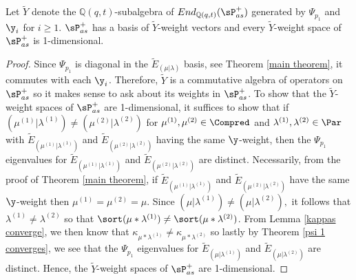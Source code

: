 \begin{thm}\label{second main theorem}
    Let $\widetilde{Y}$ denote the $\mathbb{Q}(q,t)$-subalgebra of $End_{\mathbb{Q}(q,t)}(\sP_{as}^{+})$ generated by $\Psi_{p_1}$ and $\y_i$ for $i \geq 1$. $\sP_{as}^{+}$ has a basis of $\widetilde{Y}$-weight vectors and every $\widetilde{Y}$-weight space of $\sP_{as}^{+}$ is 1-dimensional.
\end{thm}
\begin{proof}
Since $\Psi_{p_1}$ is diagonal in the $\widetilde{E}_{(\mu|\lambda)}$ basis, see Theorem \ref{main theorem}, it commutes with each $\y_i$. Therefore, $\widetilde{Y}$ is a commutative algebra of operators on $\sP_{as}^{+}$ so it makes sense to ask about its weights in $\sP_{as}^{+}$. To show that the $\widetilde{Y}$-weight spaces of $\sP_{as}^{+}$ are 1-dimensional, it suffices to show that if $(\mu^{(1)}|\lambda^{(1)}) \neq (\mu^{(2)}|\lambda^{(2)})$ for $\mu^{(1)},\mu^{(2)} \in \Compred$ and $\lambda^{(1)},\lambda^{(2)} \in \Par$ with $\widetilde{E}_{(\mu^{(1)}|\lambda^{(1)})}$ and $\widetilde{E}_{(\mu^{(2)}|\lambda^{(2)})}$ having the same $\y$-weight, then the $\Psi_{p_1}$ eigenvalues for $\widetilde{E}_{(\mu^{(1)}|\lambda^{(1)})}$ and $\widetilde{E}_{(\mu^{(2)}|\lambda^{(2)})}$ are distinct. Necessarily, from the proof of Theorem \ref{main theorem}, if $\widetilde{E}_{(\mu^{(1)}|\lambda^{(1)})}$ and $\widetilde{E}_{(\mu^{(2)}|\lambda^{(2)})}$ have the same $\y$-weight then $\mu^{(1)} = \mu^{(2)} = \mu$. Since $(\mu|\lambda^{(1)}) \neq (\mu|\lambda^{(2)}),$ it follows that $\lambda^{(1)} \neq \lambda^{(2)}$ so that $\sort(\mu*\lambda^{(1)}) \neq \sort(\mu*\lambda^{(2)} )$. From Lemma \ref{kappas converge}, we then know that $\kappa_{\mu*\lambda^{(1)}} \neq \kappa_{\mu*\lambda^{(2)}}$ so lastly by Theorem \ref{psi 1 converges}, we see that the $\Psi_{p_1}$ eigenvalues for $\widetilde{E}_{(\mu|\lambda^{(1)})}$ and $\widetilde{E}_{(\mu|\lambda^{(2)})}$ are distinct. Hence, the $\widetilde{Y}$-weight spaces of $\sP_{as}^{+}$ are 1-dimensional.
\end{proof}
